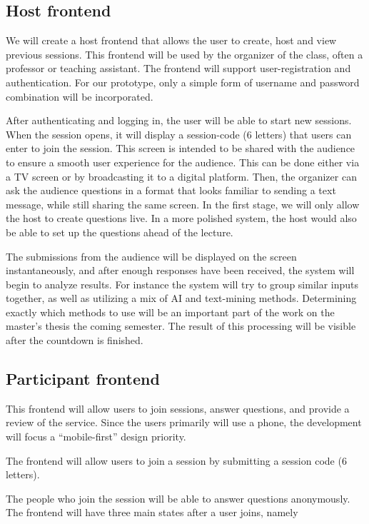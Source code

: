 \subsection{Host frontend}
We will create a host frontend that allows the user to create, host and view previous sessions. This frontend will be used by the organizer of the class, often a professor or teaching assistant. The frontend will support user-registration and authentication. For our prototype, only a simple form of username and password combination will be incorporated.

After authenticating and logging in, the user will be able to start new sessions. When the session opens, it will display a session-code (6 letters) that users can enter to join the session. This screen is intended to be shared with the audience to ensure a smooth user experience for the audience. This can be done either via a TV screen or by broadcasting it to a digital platform. Then, the organizer can ask the audience questions in a format that looks familiar to sending a text message, while still sharing the same screen. In the first stage, we will only allow the host to create questions live. In a more polished system, the host would also be able to set up the questions ahead of the lecture.

The submissions from the audience will be displayed on the screen instantaneously, and after enough responses have been received, the system will begin to analyze results. For instance the system will try to group similar inputs together, as well as utilizing a mix of AI and text-mining methods. Determining exactly which methods to use will be an important part of the work on the master's thesis the coming semester. The result of this processing will be visible after the countdown is finished.



\subsection{Participant frontend}
This frontend will allow users to join sessions, answer questions, and provide a review of the service. Since the users primarily will use a phone, the development will focus a “mobile-first” design priority. 

The frontend will allow users to join a session by submitting a session code (6 letters).

The people who join the session will be able to answer questions anonymously. The frontend will have three main states after a user joins, namely 

